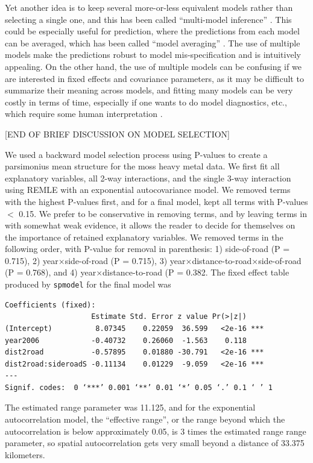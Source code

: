 \documentclass[12pt, titlepage]{article}
\begin{document}
Yet another idea is to keep several more-or-less equivalent models rather than selecting a single one, and this has been called ``multi-model inference'' \citep{BurnhamEtAl2002ModelSelectionMultimodel}.  This could be especially useful for prediction, where the predictions from each model can be averaged, which has been called ``model averaging'' \citep[e.g.][]{HoetingEtAl1999Bayesianmodelaveraging382}.  The use of multiple models make the predictions robust to model mis-specification and is intuitively appealing.  On the other hand, the use of multiple models can be confusing if we are interested in fixed effects and covariance parameters, as it may be difficult to summarize their meaning across models, and fitting many models can be very costly in terms of time, especially if one wants to do model diagnostics, etc., which require some human interpretation \citep{ver_hoef_iterating_2015}.

[END OF BRIEF DISCUSSION ON MODEL SELECTION]
 

We used a backward model selection process using P-values to create a parsimonius mean structure for the moss heavy metal data. We first fit all explanatory variables, all 2-way interactions, and the single 3-way interaction using REMLE with an exponential autocovariance model.  We removed terms with the highest P-values first, and for a final model, kept all terms with P-values $<$ 0.15.  We prefer to be conservative in removing terms, and by leaving terms in with somewhat weak evidence, it allows the reader to decide for themselves on the importance of retained explanatory variables.  We removed terms in the following order, with P-value for removal in parenthesis: 1) side-of-road (P = 0.715), 2) year$\times$side-of-road (P = 0.715), 3) year$\times$distance-to-road$\times$side-of-road (P = 0.768), and 4) year$\times$distance-to-road (P = 0.382.  The fixed effect table produced by \texttt{spmodel} for the final model was
\begin{verbatim}
Coefficients (fixed):
                    Estimate Std. Error z value Pr(>|z|)    
(Intercept)          8.07345    0.22059  36.599   <2e-16 ***
year2006            -0.40732    0.26060  -1.563    0.118    
dist2road           -0.57895    0.01880 -30.791   <2e-16 ***
dist2road:sideroadS -0.11134    0.01229  -9.059   <2e-16 ***
---
Signif. codes:  0 ‘***’ 0.001 ‘**’ 0.01 ‘*’ 0.05 ‘.’ 0.1 ‘ ’ 1
\end{verbatim}

The estimated range parameter was 11.125, and for the exponential autocorrelation model, the ``effective range'', or the range beyond which the autocorrelation is below approximately 0.05, is 3 times the estimated range range parameter, so spatial autocorrelation gets very small beyond a distance of 33.375 kilometers.
\end{document}
